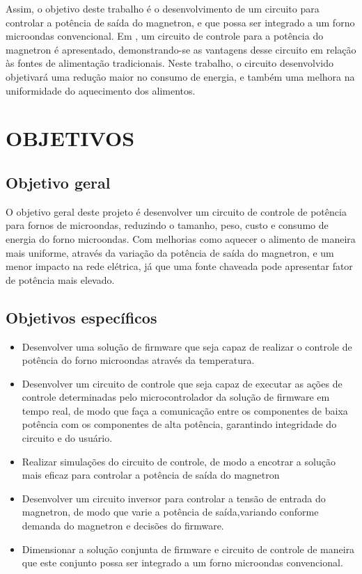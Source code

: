  Assim, o objetivo deste trabalho é o desenvolvimento de um circuito para controlar a potência de saída do magnetron, e que possa ser integrado a um forno microondas convencional. Em \cite{Hidenori1991}, um circuito de controle para a potência do magnetron é apresentado, demonstrando-se as vantagens desse circuito em relação às fontes de alimentação tradicionais. Neste trabalho, o circuito desenvolvido objetivará uma redução maior no consumo de energia, e também uma melhora na uniformidade do aquecimento dos alimentos.


\section{OBJETIVOS}
\label{sec:objetivos}


\subsection{Objetivo geral}
\label{sec:objetivosGerais}

O objetivo geral deste projeto é desenvolver um circuito de controle de potência para fornos de microondas, reduzindo o tamanho, peso, custo e consumo de energia do forno microondas. Com melhorias como aquecer o alimento de maneira mais uniforme, através da variação da potência de saída do magnetron, e um menor impacto na rede elétrica, já que uma fonte chaveada pode apresentar fator de potência mais elevado.

\subsection{Objetivos específicos}
\label{sec:objetivosEspecificos}

\begin{itemize}
    \item Desenvolver uma solução de  firmware que seja capaz de realizar o controle de potência do forno microondas através da temperatura. 
    \item Desenvolver um circuito de controle que seja capaz de executar as ações de controle determinadas pelo microcontrolador da solução de firmware em tempo real, de modo que faça a comunicação entre os componentes de baixa potência com os componentes de alta potência, garantindo integridade do circuito e do usuário. 
    \item Realizar simulações do circuito de controle, de modo a encotrar a solução mais eficaz para controlar a potência de saída do magnetron
    \item Desenvolver um circuito inversor para controlar a tensão de entrada do magnetron, de modo que varie a potência de saída,variando conforme demanda do magnetron e decisões do firmware.
    \item Dimensionar a solução conjunta de firmware e circuito de controle de maneira que este conjunto possa ser integrado a um forno microondas convencional.

\end{itemize}


